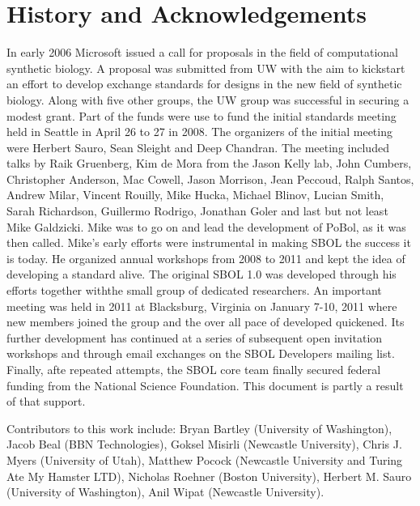 \section{History and Acknowledgements}

In early 2006 Microsoft issued a call for proposals in the field of computational synthetic biology. A proposal was submitted from UW with the aim to kickstart an effort to develop exchange standards for designs in the new field of synthetic biology. Along with five other groups, the UW group was successful in securing a modest grant. Part of the funds were use to fund the initial standards meeting held in Seattle in April 26 to 27 in 2008. The organizers of the initial meeting were Herbert Sauro, Sean Sleight and Deep Chandran. The meeting included talks by Raik Gruenberg,  Kim de Mora from the Jason Kelly lab, John Cumbers,  Christopher Anderson, Mac Cowell, Jason Morrison, Jean Peccoud, Ralph Santos, Andrew Milar, Vincent Rouilly, Mike Hucka, Michael Blinov, Lucian Smith, Sarah Richardson, Guillermo Rodrigo, Jonathan Goler and last but not least Mike Galdzicki. Mike was to go on and lead the development of PoBol, as it was then called. Mike's early efforts were instrumental in making SBOL the success it is today. He organized annual workshops from 2008 to 2011 and kept the idea of developing a standard alive. The original SBOL 1.0 was developed through his efforts together withthe small group of dedicated researchers. An important meeting was held in 2011 at Blacksburg, Virginia on January 7-10, 2011 where new members joined the group and the over all pace of developed quickened. Its further development has continued at a series of subsequent open invitation workshops and through email exchanges on the SBOL Developers mailing list. Finally, afte repeated attempts, the SBOL core team finally secured federal funding from the National Science Foundation. This document is partly a result of that support.  

Contributors to this work include: Bryan Bartley (University of Washington), Jacob Beal (BBN Technologies), Goksel Misirli (Newcastle University), Chris J. Myers (University of Utah), Matthew Pocock (Newcastle University and Turing Ate My Hamster LTD), Nicholas Roehner (Boston University), Herbert M. Sauro (University of Washington), Anil Wipat (Newcastle University).




